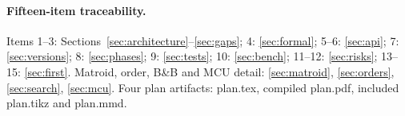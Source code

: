 \documentclass[10pt,a4paper]{article}
\begin{document}
\paragraph{Fifteen-item traceability.}
Items 1--3: Sections~\ref{sec:architecture}--\ref{sec:gaps}; 4: \ref{sec:formal}; 5--6: \ref{sec:api}; 7: \ref{sec:versions}; 8: \ref{sec:phases}; 9: \ref{sec:tests}; 10: \ref{sec:bench}; 11--12: \ref{sec:risks}; 13--15: \ref{sec:first}. Matroid, order, B\&B and MCU detail: \ref{sec:matroid}, \ref{sec:orders}, \ref{sec:search}, \ref{sec:mcu}. Four plan artifacts: plan.tex, compiled plan.pdf, included plan.tikz and plan.mmd.
\end{document}
